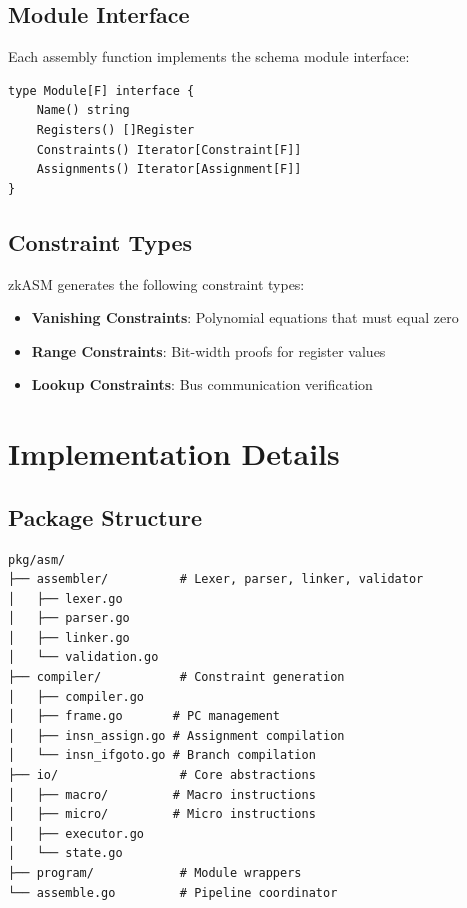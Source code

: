 \documentclass[11pt,a4paper]{article}
\begin{document}
\subsection{Module Interface}

Each assembly function implements the schema module interface:

\begin{lstlisting}[style=golang,caption={Module Interface}]
type Module[F] interface {
    Name() string
    Registers() []Register
    Constraints() Iterator[Constraint[F]]
    Assignments() Iterator[Assignment[F]]
}
\end{lstlisting}

\subsection{Constraint Types}

zkASM generates the following constraint types:

\begin{itemize}
    \item \textbf{Vanishing Constraints}: Polynomial equations that must equal zero
    \item \textbf{Range Constraints}: Bit-width proofs for register values
    \item \textbf{Lookup Constraints}: Bus communication verification
\end{itemize}

\section{Implementation Details}

\subsection{Package Structure}

\begin{verbatim}
pkg/asm/
├── assembler/          # Lexer, parser, linker, validator
│   ├── lexer.go
│   ├── parser.go
│   ├── linker.go
│   └── validation.go
├── compiler/           # Constraint generation
│   ├── compiler.go
│   ├── frame.go       # PC management
│   ├── insn_assign.go # Assignment compilation
│   └── insn_ifgoto.go # Branch compilation
├── io/                 # Core abstractions
│   ├── macro/         # Macro instructions
│   ├── micro/         # Micro instructions
│   ├── executor.go
│   └── state.go
├── program/            # Module wrappers
└── assemble.go         # Pipeline coordinator
\end{verbatim}
\end{document}
